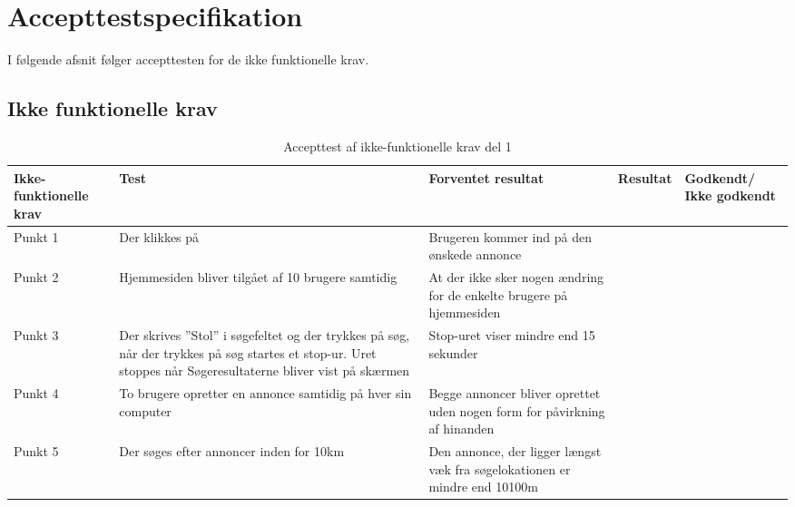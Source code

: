 \chapter{Accepttestspecifikation}\label{ch:Accepttestspecifikation}
I følgende afsnit følger accepttesten for de ikke funktionelle krav.

\section{Ikke funktionelle krav}
\setlength{\arrayrulewidth}{0.3mm}
\setlength{\tabcolsep}{12pt}
\renewcommand{\arraystretch}{1.5}
\begin{table}[H]
	\begin{tabular}{ |p{2.3cm}|p{2.2cm}|p{2.2cm}|p{2.2cm}|p{2.2cm}| } 
		\hline
		\textbf{Ikke-funktionelle krav} & \textbf{Test} & \textbf{Forventet resultat} & \textbf{Resultat} & \textbf{Godkendt/ Ikke godkendt} \\
		\hline
		Punkt 1 & Der klikkes på  & Brugeren kommer ind på den ønskede annonce &  & \\
		\hline
		Punkt 2 & Hjemmesiden bliver tilgået af 10 brugere samtidig & At der ikke sker nogen ændring for de enkelte brugere på hjemmesiden &  &  \\
		\hline
		Punkt 3 & Der skrives ''Stol'' i søgefeltet og der trykkes på søg, når der trykkes på søg startes et stop-ur. Uret stoppes når Søgeresultaterne bliver vist på skærmen & Stop-uret viser mindre end 15 sekunder &  &  \\
		\hline
		Punkt 4 & To brugere opretter en annonce samtidig på hver sin computer & Begge annoncer bliver oprettet uden nogen form for påvirkning af hinanden  &  & \\
		\hline
		Punkt 5 & Der søges efter annoncer inden for 10km & Den annonce, der ligger længst væk fra søgelokationen er mindre end 10100m &  &  \\
		\hline 
	\end{tabular}
	\caption{Accepttest af ikke-funktionelle krav del 1}
	\label{table:accepttest_ifk1}
\end{table}

